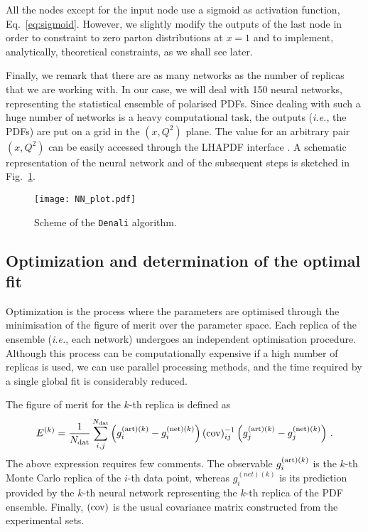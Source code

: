 All the nodes except for the input node use a sigmoid as activation function, Eq.~\eqref{eq:sigmoid}. However, we slightly modify the outputs of the last node in order to constraint to zero parton distributions at $x=1$ and to implement, analytically, theoretical constraints, as we shall see later.%

Finally, we remark that there are as many networks as the number of replicas that we are working with. In our case, we will deal with 150 neural networks, representing the statistical ensemble of polarised PDFs. Since dealing with such a huge number of networks is a heavy computational task, the outputs (\textit{i.e.}, the PDFs) are put on a grid in the $(x,Q^2)$ plane. The value for an arbitrary pair $(x,Q^2)$ can be easily accessed through the LHAPDF interface \cite{Buckley:2014ana}. A schematic representation of the neural network and of the subsequent steps is sketched in Fig.~\ref{fig:NN_plot}.
\begin{figure}[t]
  \centering
  \texttt{[image: NN\_plot.pdf]} 
  \caption{\small{Scheme of the \texttt{Denali} algorithm.}}
  \label{fig:NN_plot}
\end{figure}

\subsection*{Optimization and determination of the optimal fit}
Optimization is the process where the parameters are optimised through the minimisation of the figure of merit over the parameter space. Each replica of the ensemble (\textit{i.e.}, each network) undergoes an independent optimisation procedure. Although this process can be computationally expensive if a high number of replicas is used, we can use parallel processing methods, and the time required by a single global fit is considerably reduced.%

The figure of merit for the $k$-th replica is defined as
\begin{equation}
  E^{(k)} = \frac{1}{N_{\textrm{dat}}} \sum_{i,j}^{N_{\textrm{dat}}} \left( g_{i}^{\textrm{(art)}(k)} - g_{i}^{\textrm{(net)}(k)} \right) (\textrm{cov})^{-1}_{ij} \left( g_{j}^{\textrm{(art)}(k)} - g_{j}^{\textrm{(net)}(k)} \right) \,.
  \label{eq:EF_k}
\end{equation}
The above expression requires few comments. The observable $g_{i}^{\textrm{(art)}(k)}$ is the $k$-th Monte Carlo replica of the $i$-th data point, whereas $g_{i}^{(net)(k)}$ is its prediction provided by the $k$-th neural network representing the $k$-th replica of the PDF ensemble. Finally, $\textrm{(cov)}$ is the usual covariance matrix constructed from the experimental sets.%

